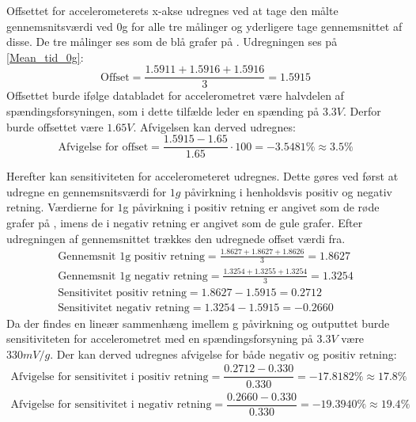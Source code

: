 Offsettet for accelerometerets x-akse udregnes ved at tage den målte gennemsnitsværdi ved $0$g for alle tre målinger og yderligere tage gennemsnittet af disse. De tre målinger ses som de blå grafer på . Udregningen ses på \ref{Mean_tid_0g}:
\begin{equation}\label{Mean_tid_0g}
\text{Offset} = \frac{1.5911 + 1.5916 + 1.5916}{3} = 1.5915
\end{equation}
\noindent Offsettet burde ifølge databladet for accelerometret være halvdelen af spændingsforsyningen, som i dette tilfælde leder en spænding på $3.3V$. \cite{Devices2009} Derfor burde offsettet være $1.65V$. Afvigelsen kan derved udregnes:
\begin{equation}
\text{Afvigelse for offset} = \dfrac{1.5915 - 1.65}{1.65} \cdot 100 = -3.5481\% \approx 3.5\%
\end{equation}

\noindent Herefter kan sensitiviteten for accelerometeret udregnes. Dette gøres ved først at udregne en gennemsnitsværdi for $1g$ påvirkning i henholdsvis positiv og negativ retning. Værdierne for $1$g påvirkning i positiv retning er angivet som de røde grafer på , imens de i negativ retning er angivet som de gule grafer. Efter udregningen af gennemsnittet trækkes den udregnede offset værdi fra.
\begin{align}
	\text{Gennemsnit 1g positiv retning} = \frac{1.8627 + 1.8627 + 1.8626}{3} = 1.8627 \\
	\text{Gennemsnit 1g negativ retning} = \frac{1.3254 + 1.3255 + 1.3254}{3} = 1.3254 \\
	\text{Sensitivitet positiv retning} = 1.8627 - 1.5915 = 0.2712 \\
	\text{Sensitivitet negativ retning} = 1.3254 - 1.5915 = -0.2660
\end{align}
\noindent Da der findes en lineær sammenhæng imellem g påvirkning og outputtet burde sensitiviteten for accelerometret med en spændingsforsyning på $3.3V$ være $330mV/g$. Der kan derved udregnes afvigelse for både negativ og positiv retning:
\begin{align}
	\text{Afvigelse for sensitivitet i positiv retning} = \dfrac{0.2712 - 0.330}{0.330} = -17.8182\% \approx 17.8\% \\
	\text{Afvigelse for sensitivitet i negativ retning} = \dfrac{0.2660 - 0.330}{0.330} = -19.3940\% \approx 19.4\%
\end{align}

